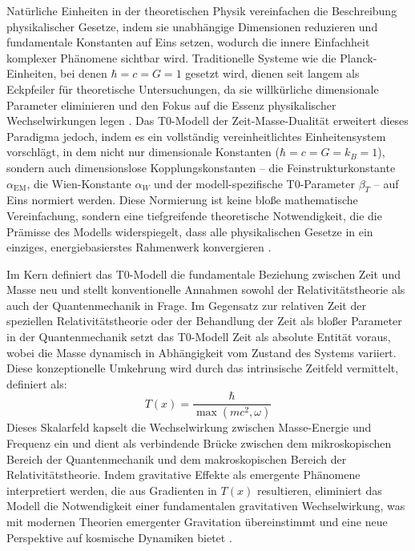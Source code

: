 \documentclass[12pt,a4paper]{article}
\newcommand{\Tfield}{T(x)}
\begin{document}
	Natürliche Einheiten in der theoretischen Physik vereinfachen die Beschreibung physikalischer Gesetze, indem sie unabhängige Dimensionen reduzieren und fundamentale Konstanten auf Eins setzen, wodurch die innere Einfachheit komplexer Phänomene sichtbar wird. Traditionelle Systeme wie die Planck-Einheiten, bei denen \(\hbar = c = G = 1\) gesetzt wird, dienen seit langem als Eckpfeiler für theoretische Untersuchungen, da sie willkürliche dimensionale Parameter eliminieren und den Fokus auf die Essenz physikalischer Wechselwirkungen legen \cite{Planck1899}. Das T0-Modell der Zeit-Masse-Dualität erweitert dieses Paradigma jedoch, indem es ein vollständig vereinheitlichtes Einheitensystem vorschlägt, in dem nicht nur dimensionale Konstanten (\(\hbar = c = G = k_B = 1\)), sondern auch dimensionslose Kopplungskonstanten – die Feinstrukturkonstante \(\alpha_{\text{EM}}\), die Wien-Konstante \(\alpha_W\) und der modell-spezifische T0-Parameter \(\beta_T\) – auf Eins normiert werden. Diese Normierung ist keine bloße mathematische Vereinfachung, sondern eine tiefgreifende theoretische Notwendigkeit, die die Prämisse des Modells widerspiegelt, dass alle physikalischen Gesetze in ein einziges, energiebasierstes Rahmenwerk konvergieren \cite{pascher_zeit_2025}.
	
	Im Kern definiert das T0-Modell die fundamentale Beziehung zwischen Zeit und Masse neu und stellt konventionelle Annahmen sowohl der Relativitätstheorie als auch der Quantenmechanik in Frage. Im Gegensatz zur relativen Zeit der speziellen Relativitätstheorie oder der Behandlung der Zeit als bloßer Parameter in der Quantenmechanik setzt das T0-Modell Zeit als absolute Entität voraus, wobei die Masse dynamisch in Abhängigkeit vom Zustand des Systems variiert. Diese konzeptionelle Umkehrung wird durch das intrinsische Zeitfeld vermittelt, definiert als:
	\[
	\Tfield = \frac{\hbar}{\max(m c^2, \omega)}
	\]
	Dieses Skalarfeld kapselt die Wechselwirkung zwischen Masse-Energie und Frequenz ein und dient als verbindende Brücke zwischen dem mikroskopischen Bereich der Quantenmechanik und dem makroskopischen Bereich der Relativitätstheorie. Indem gravitative Effekte als emergente Phänomene interpretiert werden, die aus Gradienten in \(\Tfield\) resultieren, eliminiert das Modell die Notwendigkeit einer fundamentalen gravitativen Wechselwirkung, was mit modernen Theorien emergenter Gravitation übereinstimmt und eine neue Perspektive auf kosmische Dynamiken bietet \cite{Verlinde2011, pascher_emergente_2025}.
	
\end{document}
